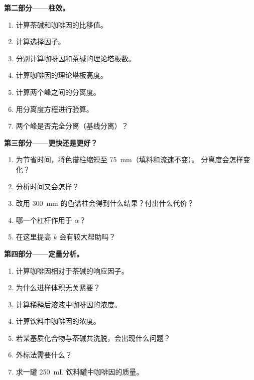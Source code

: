 \begin{problem}
\medskip
\noindent\textbf{第二部分——柱效。}
\begin{enumerate}[resume]
  \item 计算茶碱和咖啡因的比移值。
  \item 计算选择因子。
  \item 分别计算咖啡因和茶碱的理论塔板数。
  \item 计算咖啡因的理论塔板高度。
  \item 计算两个峰之间的分离度。
  \item 用分离度方程进行验算。
  \item 两个峰是否完全分离（基线分离）？
\end{enumerate}

\medskip
\noindent\textbf{第三部分——更快还是更好？}
\begin{enumerate}[resume]
  \item 为节省时间，将色谱柱缩短至 \qty{75}{mm}（填料和流速不变）。
        分离度会怎样变化？
  \item 分析时间又会怎样？
  \item 改用 \qty{300}{mm} 的色谱柱会得到什么结果？付出什么代价？
  \item 哪一个杠杆作用于 $\alpha$？
  \item 在这里提高 $k$ 会有较大帮助吗？
\end{enumerate}

\medskip
\noindent\textbf{第四部分——定量分析。}
\begin{enumerate}[resume]
  \item 计算咖啡因相对于茶碱的响应因子。
  \item 为什么进样体积无关紧要？
  \item 计算稀释后溶液中咖啡因的浓度。
  \item 计算饮料中咖啡因的浓度。
  \item 若某基质化合物与茶碱共洗脱，会出现什么问题？
  \item 外标法需要什么？
  \item 求一罐 \qty{250}{mL} 饮料罐中咖啡因的质量。
\end{enumerate}
\end{problem}
